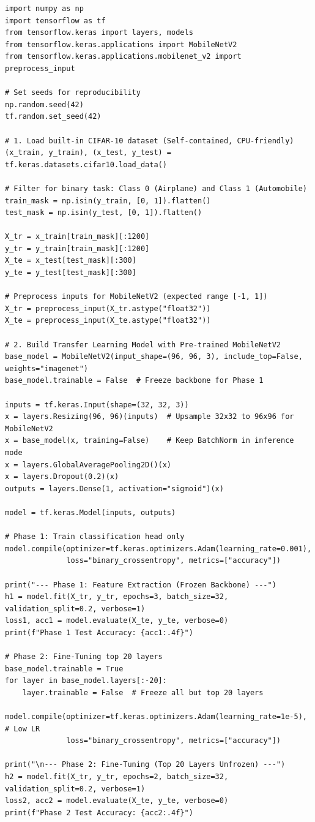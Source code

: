 \documentclass[12pt,a4paper]{article}
\begin{document}
\begin{lstlisting}
import numpy as np
import tensorflow as tf
from tensorflow.keras import layers, models
from tensorflow.keras.applications import MobileNetV2
from tensorflow.keras.applications.mobilenet_v2 import preprocess_input

# Set seeds for reproducibility
np.random.seed(42)
tf.random.set_seed(42)

# 1. Load built-in CIFAR-10 dataset (Self-contained, CPU-friendly)
(x_train, y_train), (x_test, y_test) = tf.keras.datasets.cifar10.load_data()

# Filter for binary task: Class 0 (Airplane) and Class 1 (Automobile)
train_mask = np.isin(y_train, [0, 1]).flatten()
test_mask = np.isin(y_test, [0, 1]).flatten()

X_tr = x_train[train_mask][:1200]
y_tr = y_train[train_mask][:1200]
X_te = x_test[test_mask][:300]
y_te = y_test[test_mask][:300]

# Preprocess inputs for MobileNetV2 (expected range [-1, 1])
X_tr = preprocess_input(X_tr.astype("float32"))
X_te = preprocess_input(X_te.astype("float32"))

# 2. Build Transfer Learning Model with Pre-trained MobileNetV2
base_model = MobileNetV2(input_shape=(96, 96, 3), include_top=False, weights="imagenet")
base_model.trainable = False  # Freeze backbone for Phase 1

inputs = tf.keras.Input(shape=(32, 32, 3))
x = layers.Resizing(96, 96)(inputs)  # Upsample 32x32 to 96x96 for MobileNetV2
x = base_model(x, training=False)    # Keep BatchNorm in inference mode
x = layers.GlobalAveragePooling2D()(x)
x = layers.Dropout(0.2)(x)
outputs = layers.Dense(1, activation="sigmoid")(x)

model = tf.keras.Model(inputs, outputs)

# Phase 1: Train classification head only
model.compile(optimizer=tf.keras.optimizers.Adam(learning_rate=0.001),
              loss="binary_crossentropy", metrics=["accuracy"])

print("--- Phase 1: Feature Extraction (Frozen Backbone) ---")
h1 = model.fit(X_tr, y_tr, epochs=3, batch_size=32, validation_split=0.2, verbose=1)
loss1, acc1 = model.evaluate(X_te, y_te, verbose=0)
print(f"Phase 1 Test Accuracy: {acc1:.4f}")

# Phase 2: Fine-Tuning top 20 layers
base_model.trainable = True
for layer in base_model.layers[:-20]:
    layer.trainable = False  # Freeze all but top 20 layers

model.compile(optimizer=tf.keras.optimizers.Adam(learning_rate=1e-5),  # Low LR
              loss="binary_crossentropy", metrics=["accuracy"])

print("\n--- Phase 2: Fine-Tuning (Top 20 Layers Unfrozen) ---")
h2 = model.fit(X_tr, y_tr, epochs=2, batch_size=32, validation_split=0.2, verbose=1)
loss2, acc2 = model.evaluate(X_te, y_te, verbose=0)
print(f"Phase 2 Test Accuracy: {acc2:.4f}")
\end{lstlisting}
\end{document}
